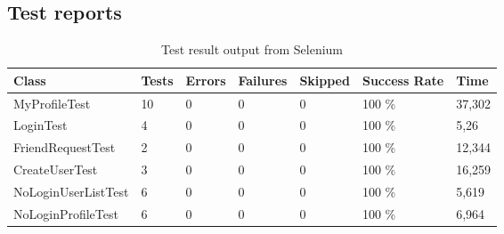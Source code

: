 \documentclass[a4paper]{article}
\begin{document}
\subsection{Test reports}
\begin{table}[h!]
\begin{tabular}{| l | l | l | l | l | l | l |}
\hline
\textbf{Class} & \textbf{Tests} & \textbf{Errors} & \textbf{Failures} & \textbf{Skipped} & \textbf{Success Rate} & \textbf{Time} \\ \hline
MyProfileTest & 10 & 0 & 0 & 0 & 100 \% & 37,302 \\ \hline
LoginTest & 4 & 0 & 0 & 0 & 100 \% & 5,26 \\ \hline
FriendRequestTest & 2 & 0 & 0 & 0 & 100 \% & 12,344 \\ \hline
CreateUserTest & 3 & 0 & 0 & 0 & 100 \% & 16,259 \\ \hline
NoLoginUserListTest & 6 & 0 & 0 & 0 & 100 \% & 5,619 \\ \hline
NoLoginProfileTest & 6 & 0 & 0 & 0 & 100 \% & 6,964 \\ \hline
\end{tabular}
\caption{Test result output from Selenium}
\label{tab:test_results_overview}
\end{table}
\end{document}
